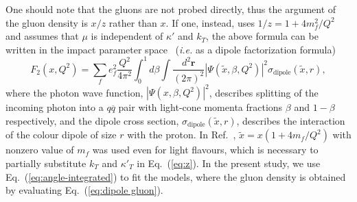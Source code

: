 \documentclass[11pt]{article}
\begin{document}
One should note that the gluons are not probed directly, thus the argument of
the gluon density is $x/z$ rather than $x$.  If one, instead, uses $ 1/z=1+4
m_f^2/Q^2$ and assumes that $\mu$ is independent of $\kappa'$ and $k_T$, the
above formula can be written in the impact parameter
space~\cite{Golec-Biernat:1998zce,Nikolaev:1990ja} ({\it i.e.} as a dipole
factorization formula)
%
\begin{equation}
  F_2\left(x,Q^2\right)=\sum_f e_f^2 \frac{Q^2}{4\pi^2} \int^1_0d\beta \int \frac{d^2\mathbf{r}}{(2\pi)^2} \left|\Psi\left(\tilde{x},\beta,Q^2\right)\right|^2\sigma_{\mathrm{dipole}}\left(\tilde{x},r\right),
  \label{eq:dipole factorization}
\end{equation}
%
where the photon wave function, $\left|\Psi\left(x,\beta,Q^2\right)\right|^2$,
describes splitting of the incoming photon into a $q\overline{q}$ pair with
light-cone momenta fractions $\beta$ and $1-\beta$ respectively, and the dipole
cross section, $\sigma_{\mathrm{dipole}}\left(\tilde x,r\right)$, describes the
interaction of the colour dipole of size $r$ with the proton. In
Ref.~\cite{Golec-Biernat:1998zce}, $\tilde{x}=x(1+4m_f/Q^2)$ with nonzero value
of $m_f$ was used even for light flavours, which is necessary to partially
substitute $k_T$ and ${\kappa'}_T$ in Eq.~(\ref{eq:z}).
In the present study, we use Eq.~(\ref{eq:angle-integrated}) to fit the models, where the gluon density is obtained by evaluating Eq.~(\ref{eq:dipole gluon}).
\end{document}
